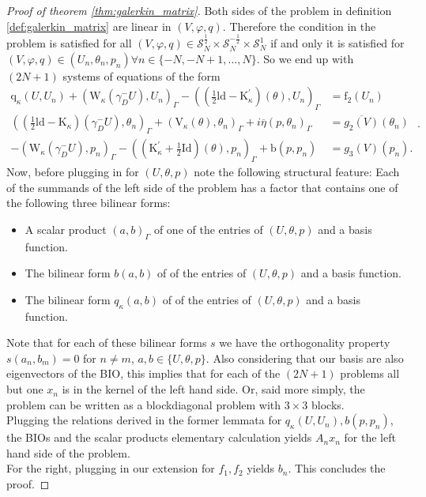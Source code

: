 \documentclass[10pt,journal,compsoc, onecolumn]{IEEEtran}
\begin{document}
\begin{proof}[Proof of theorem \ref{thm:galerkin_matrix}]
    Both sides of the problem in definition \ref{def:galerkin_matrix} are linear in $(V, \varphi, q)$. 
    Therefore the condition in the problem is satisfied for all 
    $(V, \varphi, q)\in \mathcal{S}^{\frac{1}{2}}_N  \times  \mathcal{S}^{-\frac{1}{2}}_N \times  \mathcal{S}^{1}_N$
    if and only it is satisfied for $(V, \varphi, q) \in (U_n, \theta_n, p_n) \forall n \in \{-N, -N+1, ..., N\}$.
    So we end up with $(2N + 1)$ systems of equations of the form 
    $$
    \begin{aligned}
        \mathrm{q}_{\kappa}(U, U_n)+\left(\mathrm{W}_{\kappa}\left(\gamma_{D}^{-} U\right), U_n\right)_{\Gamma}-\left((\frac{1}{2} \mathrm{ld}-\mathrm{K}_{\kappa}^{\prime})(\theta),U_n\right)_{\Gamma} &=\mathrm{f}_{2}(U_n) \\
        \left((\frac{1}{2} \mathrm{ld}-\mathrm{K}_{\kappa})\left(\gamma_{D}^{-} U\right), \theta_n\right)_{\Gamma}+\left(\mathrm{V}_{\kappa}(\theta), \theta_n\right)_{\Gamma}+i \overline{\eta}(p, \theta_n)_{\Gamma} &=\overline{g_2(V)}(\theta_n) \\
        -\left(\mathrm{W}_{\kappa}\left(\gamma_{D}^{-} U\right), p_n\right)_{\Gamma}-\left((\mathrm{K}_{\kappa}^{\prime}+\frac{1}{2} \mathrm{Id})(\theta), p_n\right)_{\Gamma}+\mathrm{b}(p, p_n) &=g_3(V)(p_n).
    \end{aligned}.
    $$
    Now, before plugging in for $(U, \theta, p)$ note the following structural feature: 
    Each of the summands of the left side of the problem has a factor that contains one of the following three bilinear forms:
    \begin{itemize}
        \item A scalar product $(a,b)_\Gamma$ of one of the entries of $(U, \theta, p)$ and a basis function. 
        \item The bilinear form $b(a,b)$ of of the entries of $(U, \theta, p)$ and a basis function. 
        \item The bilinear form $q_\kappa(a,b)$ of of the entries of $(U, \theta, p)$ and a basis function. 
    \end{itemize}
    Note that for each of these bilinear forms $s$ we have the orthogonality property $s(a_n, b_m) = 0$ for $n \neq m$, $a, b \in \{U, \theta, p\}$.
    Also considering that our basis are also eigenvectors of the BIO, this implies that for each of the $(2N + 1)$ problems all but one $x_n$ is in the kernel of the left hand side.
    Or, said more simply, the problem can be written as a blockdiagonal problem with $3 \times 3$ blocks. \\
    Plugging the relations derived in the former lemmata for $q_\kappa (U, U_n), b(p, p_n)$, 
    the BIOs and the scalar products elementary calculation yields
    $A_n x_n$ for the left hand side of the problem.  \\
    For the right, plugging in our extension for $f_1, f_2$ yields $b_n$.
    This concludes the proof. 
\end{proof} 
\end{document}
